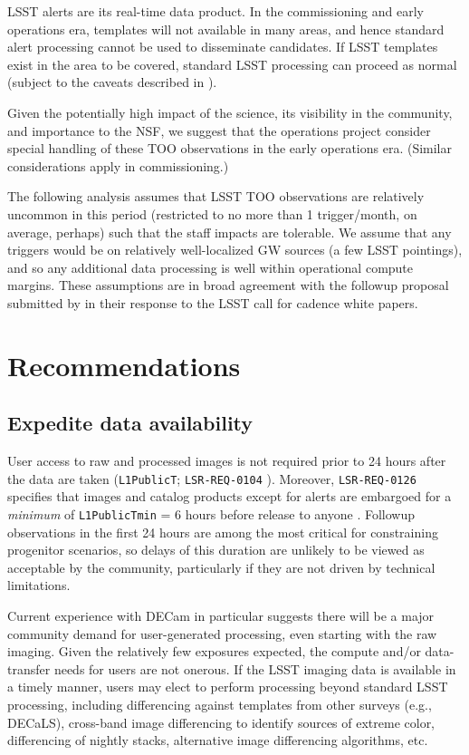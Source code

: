 \documentclass[OPS,toc,lsstdraft]{lsstdoc}
\begin{document}
LSST alerts are its real-time data product.  
In the commissioning and early operations era, 
templates will not available in many areas, and hence standard alert processing cannot be used to disseminate candidates.
If LSST templates exist in the area to be covered, standard LSST processing can proceed as normal (subject to the caveats described in ).

Given the potentially high impact of the science, its visibility in the community, and importance to the NSF, we suggest that the operations project consider special handling of these TOO observations in the early operations era.  
(Similar considerations apply in commissioning.) 

The following analysis assumes that LSST TOO observations are relatively uncommon in this period (restricted to no more than 1 trigger/month, on average, perhaps) such that the staff impacts are tolerable.  
We assume that any triggers would be on relatively well-localized GW sources (a few LSST pointings), and so any additional data processing is well within operational compute margins.
These assumptions are in broad agreement with the followup proposal submitted by \citet{2018arXiv181204051M} in their response to the LSST call for cadence  white papers.

\section{Recommendations}

\subsection{Expedite data availability} \label{sec:data}

User access to raw and processed images is not required prior to 24 hours after the data are taken (\texttt{L1PublicT}; \texttt{LSR-REQ-0104} ).  
Moreover, \texttt{LSR-REQ-0126} specifies that images and catalog products except for alerts are embargoed for a \textit{minimum} of \texttt{L1PublicTmin} = 6 hours before release to anyone .
Followup observations in the first 24 hours are among the most critical for constraining progenitor scenarios, so delays of this duration are unlikely to be viewed as acceptable by the community, particularly if they are not driven by technical limitations.

Current experience with DECam in particular suggests there will be a major community demand for user-generated processing, even starting with the raw imaging. 
Given the relatively few exposures expected, the compute and/or data-transfer needs for users are not onerous.
If the LSST imaging data is available in a timely manner, users may elect to perform processing beyond standard LSST processing, including differencing against templates from other surveys (e.g., DECaLS), cross-band image differencing to identify sources of extreme color, differencing of nightly stacks, alternative image differencing algorithms, etc.
\end{document}
